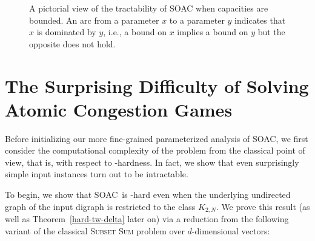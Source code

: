 \documentclass[letterpaper]{article} %
\newcommand{\problem}{{\sc SOAC}\xspace} %
\begin{document}
\begin{figure}
\vspace{0.3cm}
\centering
{}
 \caption{A pictorial view of the tractability of \problem when capacities are bounded. 
An arc from a parameter $x$ to a parameter $y$ indicates that $x$ is dominated by $y$, i.e., a bound on $x$ implies a bound on $y$ but the opposite does not hold.}
 \label{fig:pararel}
\end{figure}


\section{The Surprising Difficulty of Solving Atomic Congestion Games}
\label{sec:nph}
Before initializing our more fine-grained parameterized analysis of \problem, we first 
consider the computational complexity of the problem from the classical point of view, that is, with respect to \NP-hardness. In fact, we show that even surprisingly simple input instances turn out to be intractable.

To begin, we show that \problem\ is \NP-hard even when the underlying undirected graph of the input digraph is restricted to the class $K_{2,N}$. We prove this result (as well as Theorem~\ref{hard-tw-delta} later on) via a reduction from the following variant of the classical \textsc{Subset Sum} problem over $d$-dimensional vectors: 
\end{document}
